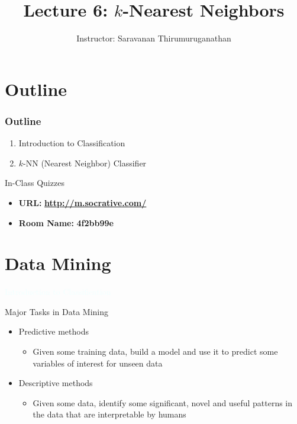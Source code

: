 \documentclass{beamer}
\title[Saravanan Thirumuruganathan] 
{Lecture 6: $k$-Nearest Neighbors}
\author[CSE 5334] 
{Instructor: Saravanan Thirumuruganathan}
\date[]
\newcommand{\thblue}[1]{{\Huge {\textcolor{azure}{#1}}}}
\begin{document}
\begin{frame}
  \titlepage
\end{frame}


\section{Outline}

\begin{frame}
\frametitle {Outline}
\begin{enumerate}
\item Introduction to Classification
\item $k$-NN (Nearest Neighbor) Classifier
\end{enumerate}
\end{frame}


\begin{frame}{In-Class Quizzes}
\begin{itemize}
\item {\Large {\bf URL:}} {\LARGE \bf \url{http://m.socrative.com/}} 
\item {\Large {\bf Room Name:} {\LARGE \bf 4f2bb99e}}
\end{itemize}
\end{frame}


\section{Data Mining}
\begin{frame}{} 
    \begin{center}
        \thblue{Introduction to Classification}
    \end{center}
\end{frame}

\begin{frame}{Major Tasks in Data Mining}
    \begin{itemize}
        \item Predictive methods
            \begin{itemize}
                \item Given some training data, build a model and use it to predict some variables of interest for unseen data  
            \end{itemize}
        \item Descriptive methods
            \begin{itemize}
                \item Given some data, identify some significant, novel and useful patterns in the data that are interpretable by humans
            \end{itemize}
    \end{itemize}
\end{frame}
\end{document}
